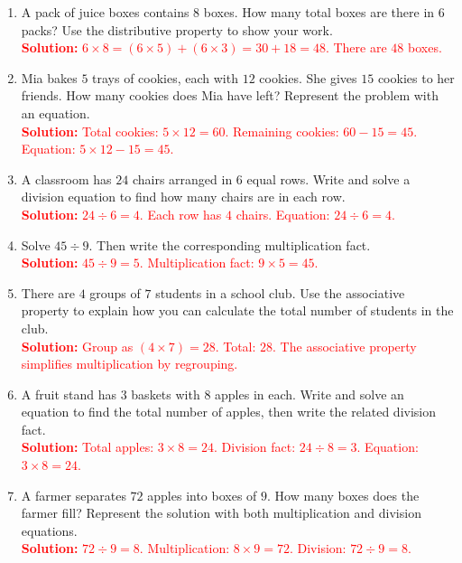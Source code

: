 \documentclass[12pt]{article}
\begin{document}
\vspace{1em}

\begin{tcolorbox}[colframe=black!60, colback=white, 
coltitle=black, colbacktitle=black!15, fonttitle=\bfseries\Large, 
title=Problems, halign title=center, left=10pt, right=10pt, top=10pt, bottom=60pt]
\begin{enumerate}[start=9, itemsep=3em]
    \item A pack of juice boxes contains \(8\) boxes. How many total boxes are there in \(6\) packs? Use the distributive property to show your work.\\
    \textcolor{red}{\textbf{Solution:} \(6 \times 8 = (6 \times 5) + (6 \times 3) = 30 + 18 = 48\). There are \(48\) boxes.}

    \item Mia bakes \(5\) trays of cookies, each with \(12\) cookies. She gives \(15\) cookies to her friends. How many cookies does Mia have left? Represent the problem with an equation.\\
    \textcolor{red}{\textbf{Solution:} Total cookies: \(5 \times 12 = 60\). Remaining cookies: \(60 - 15 = 45\). Equation: \(5 \times 12 - 15 = 45\).}

    \item A classroom has \(24\) chairs arranged in \(6\) equal rows. Write and solve a division equation to find how many chairs are in each row.\\
    \textcolor{red}{\textbf{Solution:} \(24 \div 6 = 4\). Each row has \(4\) chairs. Equation: \(24 \div 6 = 4\).}

    \item Solve \(45 \div 9\). Then write the corresponding multiplication fact.\\
    \textcolor{red}{\textbf{Solution:} \(45 \div 9 = 5\). Multiplication fact: \(9 \times 5 = 45\).}

    \item There are \(4\) groups of \(7\) students in a school club. Use the associative property to explain how you can calculate the total number of students in the club.\\
    \textcolor{red}{\textbf{Solution:} Group as \((4 \times 7) = 28\). Total: \(28\). The associative property simplifies multiplication by regrouping.}

    \item A fruit stand has \(3\) baskets with \(8\) apples in each. Write and solve an equation to find the total number of apples, then write the related division fact.\\
    \textcolor{red}{\textbf{Solution:} Total apples: \(3 \times 8 = 24\). Division fact: \(24 \div 8 = 3\). Equation: \(3 \times 8 = 24\).}

    \item A farmer separates \(72\) apples into boxes of \(9\). How many boxes does the farmer fill? Represent the solution with both multiplication and division equations.\\
    \textcolor{red}{\textbf{Solution:} \(72 \div 9 = 8\). Multiplication: \(8 \times 9 = 72\). Division: \(72 \div 9 = 8\).}
\end{enumerate}
\end{tcolorbox}
\end{document}

